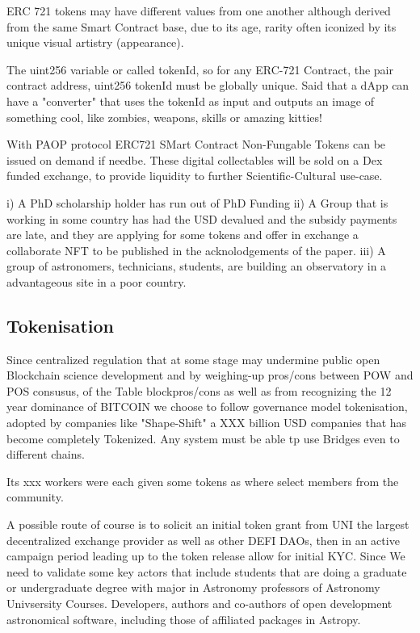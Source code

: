 \documentclass[final,5p,times,twocolumn,authoryear]{elsarticle}
\begin{document}
ERC 721 tokens may have different values from one another although derived from the same Smart Contract base, due to its age, rarity often iconized by its unique visual artistry (appearance).

The uint256 variable or called tokenId, so for any ERC-721 Contract, the pair contract address, uint256 tokenId must be globally unique. Said that a dApp can have a "converter" that uses the tokenId as input and outputs an image of something cool, like zombies, weapons, skills or amazing kitties!


With PAOP protocol ERC721 SMart Contract Non-Fungable Tokens can be issued on demand if needbe. These digital collectables will be sold on a Dex funded exchange, to provide liquidity to further Scientific-Cultural use-case.

i) A PhD scholarship holder has run out of PhD Funding 
ii) A Group that is working in some country has had the USD devalued and the subsidy payments are late, and they are applying for some tokens and offer in exchange a collaborate NFT to be published in the acknolodgements of the paper.
iii) A group of astronomers, technicians, students,  are building an observatory in a advantageous site in a poor country. 

\subsection{Tokenisation}

Since centralized regulation that at some stage may undermine public open Blockchain science development and by weighing-up pros/cons between POW and POS consusus, of the Table blockpros/cons as well as from recognizing the 12 year dominance of BITCOIN we choose to follow governance model tokenisation, adopted by  companies like "Shape-Shift" a XXX billion USD companies that has become completely Tokenized. Any system must be able tp use Bridges even to different chains. 

Its xxx workers were each given some tokens as where select members from the community. 

A possible route of course is to solicit an initial token grant from UNI the largest decentralized exchange provider as well as other DEFI DAOs, then in an active campaign period leading up to the token release allow for initial KYC. Since We need to validate some key actors that include students that are doing a graduate or undergraduate degree with major in Astronomy professors of Astronomy Univsersity Courses. Developers, authors and co-authors of open development astronomical software, including those of affiliated packages in Astropy. 
\end{document}
